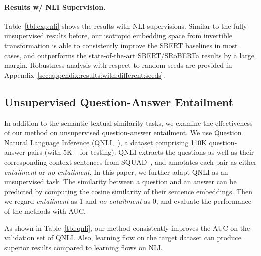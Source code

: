\documentclass[11pt,a4paper]{article}
\begin{document}
\paragraph{Results w/ NLI Supervision.}
Table~\ref{tbl:exp:nli} shows the results with NLI supervisions. Similar to the fully unsupervised results before, our isotropic embedding space from invertible transformation is able to consistently improve the SBERT baselines in most cases, and outperforms the state-of-the-art SBERT/SRoBERTa results by a large margin. Robustness analysis with respect to random seeds are provided in Appendix~\ref{sec:appendix:results:with:different:seeds}.







\vspace{-5pt}
\subsection{Unsupervised Question-Answer Entailment}
\vspace{-5pt}
In addition to the semantic textual similarity tasks, we  examine the effectiveness of our method on unsupervised question-answer entailment. We use Question Natural Language Inference (QNLI,~\citet{wang2018glue}), a dataset comprising 110K question-answer pairs (with 5K+ for testing). QNLI extracts the questions as well as their corresponding context sentences from SQUAD~\citep{rajpurkar2016squad}, and annotates each pair as either \textit{entailment} or \textit{no entailment}. 
In this paper, we further adapt QNLI as an unsupervised task. The similarity between a question and an answer can be predicted by computing the cosine similarity of their sentence embeddings. Then we regard \textit{entailment} as 1 and \textit{no entailment} as 0, and evaluate the performance of the methods with AUC.



As shown in Table~\ref{tbl:qnli}, our method consistently improves the AUC on the validation set of QNLI. Also, learning flow on the target dataset can produce superior results compared to learning flows on NLI. 
\end{document}
